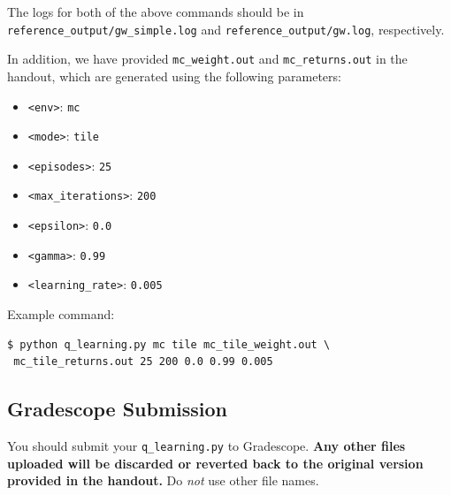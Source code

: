 \documentclass[11pt,addpoints,answers]{exam}
\begin{document}
The logs for both of the above commands should be in \texttt{reference\_output/gw\_simple.log} and \texttt{reference\_output/gw.log}, respectively.

In addition, we have provided \texttt{mc\_weight.out} and \texttt{mc\_returns.out} in the handout, which are generated using the following parameters:
\begin{itemize}
    \item \texttt{<env>}: \texttt{mc}
    \item \texttt{<mode>}: \texttt{tile}
    \item \texttt{<episodes>}: \texttt{25}
    \item \texttt{<max\_iterations>}: \texttt{200}
    \item \texttt{<epsilon>}: \texttt{0.0}
    \item \texttt{<gamma>}: \texttt{0.99}
    \item \texttt{<learning\_rate>}: \texttt{0.005}
\end{itemize}

Example command:
\begin{lstlisting}[language=Shell]
$ python q_learning.py mc tile mc_tile_weight.out \
 mc_tile_returns.out 25 200 0.0 0.99 0.005
\end{lstlisting}

\subsection{Gradescope Submission}

You should submit your \texttt{q\_learning.py} to Gradescope.
\textbf{Any other files uploaded will be discarded or reverted back to the original version provided in the handout.}
Do \textit{not} use other file names.
\end{document}
